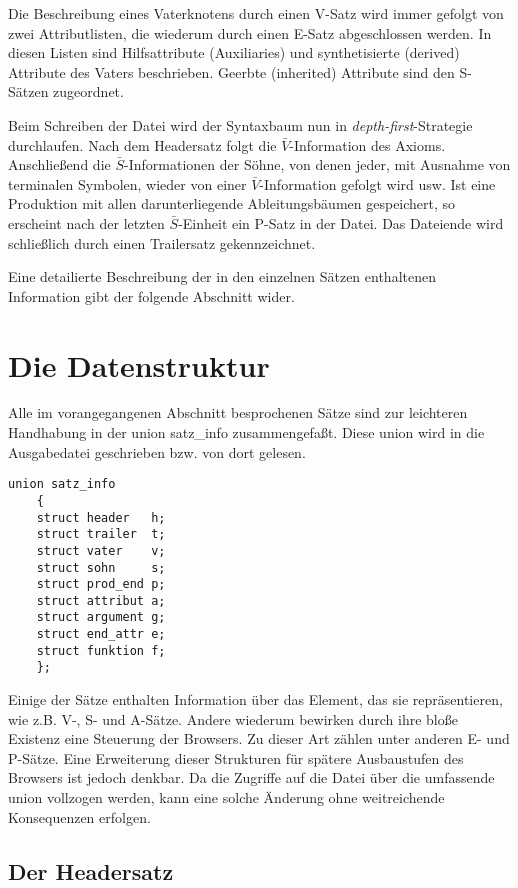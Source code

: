 Die Beschreibung eines Vaterknotens durch einen V-Satz wird immer gefolgt von zwei Attributlisten, die wiederum durch einen E-Satz abgeschlossen
werden. In diesen Listen sind Hilfsattribute (Auxiliaries) und synthetisierte (derived) Attribute des Vaters beschrieben. Geerbte (inherited)
Attribute sind den S-S\"atzen zugeordnet.

Beim Schreiben der Datei wird der Syntaxbaum nun in {\it depth-first}-Strategie durchlaufen. Nach dem Headersatz folgt die $\bar V$-Information des
Axioms. Anschlie\ss{}end die $\bar S$-Informationen der S\"ohne, von denen jeder, mit Ausnahme von terminalen Symbolen, wieder von einer $\bar
V$-Information gefolgt wird usw. Ist eine Produktion mit allen darunterliegende Ableitungsb\"aumen gespeichert, so erscheint nach der letzten $\bar
S$-Einheit ein P-Satz in der Datei. Das Dateiende wird schlie\ss{}lich durch einen Trailersatz gekennzeichnet.

Eine detailierte Beschreibung der in den einzelnen S\"atzen enthaltenen Information gibt der folgende Abschnitt wider.

\section{Die Datenstruktur}

Alle im vorangegangenen Abschnitt besprochenen S\"atze sind zur leichteren Handhabung in der union satz\_info zusammengefa\ss{}t.
Diese union wird in die Ausgabedatei geschrieben bzw. von dort gelesen.

\begin{small}\begin{verbatim}
union satz_info
	{
	struct header   h;
	struct trailer  t;
	struct vater    v;
	struct sohn     s;
	struct prod_end p;
	struct attribut a;
	struct argument g;
	struct end_attr e;
	struct funktion f;
	};
\end{verbatim}\end{small}

Einige der S\"atze enthalten Information \"uber das Element, das sie repr\"asentieren, wie z.B. V-, S- und A-S\"atze. Andere wiederum bewirken durch ihre
blo\ss{}e Existenz eine Steuerung der Browsers. Zu dieser Art z\"ahlen unter anderen E- und P-S\"atze. Eine Erweiterung dieser Strukturen f\"ur sp\"atere
Ausbaustufen des Browsers ist jedoch denkbar. Da die Zugriffe auf die Datei \"uber die umfassende union vollzogen werden, kann eine solche \"Anderung
ohne weitreichende Konsequenzen erfolgen.

\subsection{Der Headersatz}

